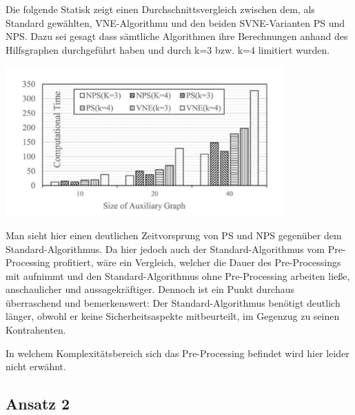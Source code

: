 \documentclass{lni}
\begin{document}
Die folgende Statisk zeigt einen Durchschnittsvergleich zwischen dem, als Standard gewählten, VNE-Algorithmu \cite{Std} und den beiden SVNE-Varianten PS und NPS. Dazu sei gesagt dass sämtliche Algorithmen ihre Berechnungen anhand des Hilfsgraphen durchgeführt haben und durch k=3 bzw. k=4 limitiert wurden.\newline
\begin{center}
	\includegraphics[width=0.8\textwidth]{statistic.pdf}\newline
\end{center}
Man sieht  hier einen deutlichen Zeitvorsprung von PS und NPS gegenüber dem Standard-Algorithmus. Da hier jedoch auch der Standard-Algorithmus vom Pre-Processing profitiert, wäre ein Vergleich, welcher die Dauer des Pre-Processings mit aufnimmt und den Standard-Algorithmus ohne Pre-Processing arbeiten ließe, anschaulicher und aussagekräftiger.
Dennoch ist ein Punkt durchaus überraschend und bemerkenswert: Der Standard-Algorithmus benötigt deutlich länger, obwohl er keine Sicherheitsaspekte mitbeurteilt, im Gegenzug zu seinen Kontrahenten.

In welchem Komplexitätsbereich sich das Pre-Processing befindet wird hier leider nicht erwähnt.


\subsection{Ansatz 2}
\end{document}
